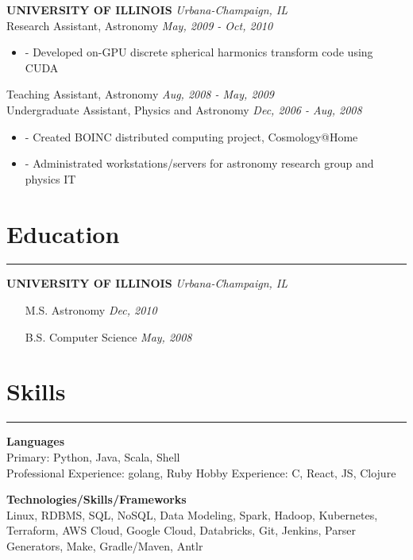 \documentclass[a4paper,11pt]{article}
\newenvironment{pitemize}{
\begin{itemize}
\setlength{\itemsep}{.01in}
\setlength{\parskip}{.01in}
}
{\end{itemize}}
\begin{document}
\vspace{0.2in}
\textbf{UNIVERSITY OF ILLINOIS} \hfill \textit{Urbana-Champaign, IL} \\
Research Assistant, Astronomy \hfill \textit{May, 2009 - Oct, 2010}
\begin{pitemize}
\item[-]Developed on-GPU discrete spherical harmonics transform code using CUDA
\end{pitemize}
Teaching Assistant, Astronomy \hfill \textit{Aug, 2008 - May, 2009} \\
Undergraduate Assistant, Physics and Astronomy \hfill \textit{Dec, 2006 - Aug, 2008}
\begin{pitemize}
\item[-]Created BOINC distributed computing project, Cosmology@Home
\item[-]Administrated workstations/servers for astronomy research group and physics IT
\end{pitemize}


\section*{\huge{Education}}
\hrule
\vspace{0.1in}
\textbf{UNIVERSITY OF ILLINOIS} \hfill \textit{Urbana-Champaign, IL}
\begin{itemize}
\setlength{\itemsep}{0.0in}
\item[]M.S. Astronomy \hfill \textit{Dec, 2010}
\item[]B.S. Computer Science \hfill \textit{May, 2008}
\end{itemize}

\section*{\huge{Skills}}
\hrule
\vspace{0.1in}
\textbf{Languages} \\
Primary: Python, Java, Scala, Shell \\
Professional Experience: golang, Ruby
Hobby Experience: C, React, JS, Clojure

\vspace{0.1in}

\textbf{Technologies/Skills/Frameworks} \\
Linux, RDBMS, SQL, NoSQL, Data Modeling, Spark, Hadoop, Kubernetes, Terraform, AWS Cloud, Google Cloud, Databricks, Git, Jenkins, Parser Generators, Make, Gradle/Maven, Antlr
\end{document}
